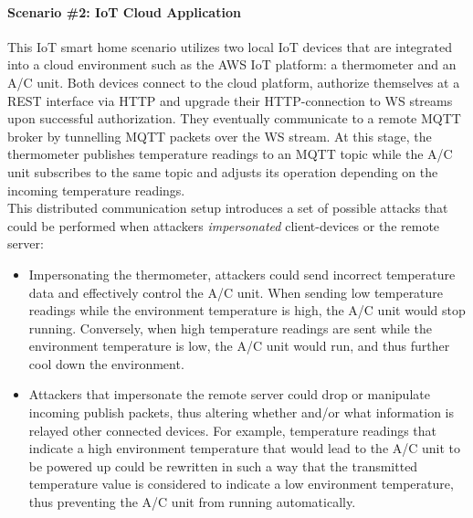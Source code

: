\paragraph{Scenario \#2: \ac{IoT} Cloud Application} This \ac{IoT} smart home scenario utilizes two local \ac{IoT} devices that are integrated into a cloud environment such as the \ac{AWS} \ac{IoT} platform: a thermometer and an \ac{A/C} unit. Both devices connect to the cloud platform, authorize themselves at a \ac{REST} interface via \ac{HTTP} and upgrade their \ac{HTTP}-connection to \ac{WS} streams upon successful authorization. They eventually communicate to a remote \ac{MQTT} broker by tunnelling \ac{MQTT} packets over the \ac{WS} stream. At this stage, the thermometer publishes temperature readings to an \ac{MQTT} topic while the \ac{A/C} unit subscribes to the same topic and adjusts its operation depending on the incoming temperature readings. \\
This distributed communication setup introduces a set of possible attacks that could be performed when attackers \emph{impersonated} client-devices or the remote server:
\begin{itemize}
    \item Impersonating the thermometer, attackers could send incorrect temperature data and effectively control the \ac{A/C} unit. When sending low temperature readings while the environment temperature is high, the \ac{A/C} unit would stop running. Conversely, when high temperature readings are sent while the environment temperature is low, the \ac{A/C} unit would run, and thus further cool down the environment.
    \item Attackers that impersonate the remote server could drop or manipulate incoming publish packets, thus altering whether and/or what information is relayed other connected devices. For example, temperature readings that indicate a high environment temperature that would lead to the \ac{A/C} unit to be powered up could be rewritten in such a way that the transmitted temperature value is considered to indicate a low environment temperature, thus preventing the \ac{A/C} unit from running automatically.
\end{itemize}

